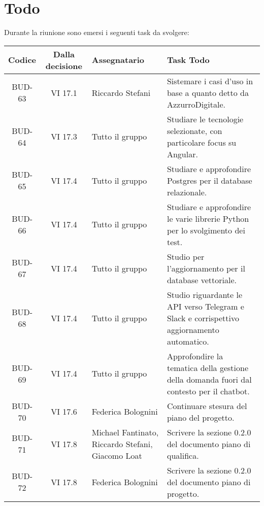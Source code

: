 
\section{Todo}

Durante la riunione sono emersi i seguenti task da svolgere:

\vspace{0.5cm}

\begin{table}[htbp]
\centering
{}
\begin{tabular}{|c|c|p{}|p{}|}
    \hline
    \rowcolor[gray]{0.75}
    \textbf{Codice} & \textbf{Dalla decisione} & \textbf{Assegnatario} & \textbf{Task Todo} \\
    \hline
    BUD-63 & VI 17.1 & Riccardo Stefani & Sistemare i casi d'uso in base a quanto detto da AzzurroDigitale. \\
    \hline
    BUD-64 & VI 17.3 & Tutto il gruppo & Studiare le tecnologie selezionate, con particolare focus su Angular. \\
    \hline
    BUD-65 & VI 17.4 & Tutto il gruppo & Studiare e approfondire Postgres per il database relazionale. \\
    \hline
    BUD-66 & VI 17.4 & Tutto il gruppo & Studiare e approfondire le varie librerie Python per lo svolgimento dei test. \\
    \hline
    BUD-67 & VI 17.4 & Tutto il gruppo & Studio per l'aggiornamento per il database vettoriale. \\
    \hline
    BUD-68 & VI 17.4 & Tutto il gruppo & Studio riguardante le API verso Telegram e Slack e corrispettivo aggiornamento automatico. \\
    \hline
    BUD-69 & VI 17.4 & Tutto il gruppo & Approfondire la tematica della gestione della domanda fuori dal contesto per il chatbot. \\
    \hline
    BUD-70 & VI 17.6 & Federica Bolognini & Continuare stesura del piano del progetto. \\
    \hline
    BUD-71 & VI 17.8 & Michael Fantinato, Riccardo Stefani, Giacomo Loat & Scrivere la sezione 0.2.0 del documento piano di qualifica. \\
    \hline
    BUD-72 & VI 17.8 & Federica Bolognini& Scrivere la sezione 0.2.0 del documento piano di progetto. \\

\end{tabular}
\end{table}
